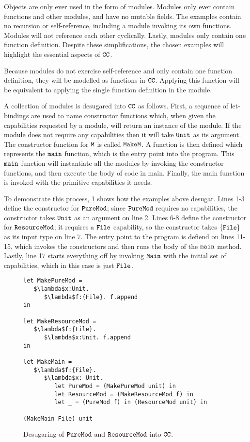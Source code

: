 Objects are only ever used in the form of modules. Modules only ever contain functions and other modules, and have no mutable fields. The examples contain no recursion or self-reference, including a module invoking its own functions. Modules will not reference each other cyclically. Lastly, modules only contain one function definition. Despite these simplifications, the chosen examples will highlight the essential aspects of $\mathtt{CC}$.

Because modules do not exercise self-reference and only contain one function definition, they will be modelled as functions in $\mathtt{CC}$. Applying this function will be equivalent to applying the single function definition in the module.

A collection of modules is desugared into $\mathtt{CC}$ as follows. First, a sequence of let-bindings are used to name constructor functions which, when given the capabilities requested by a module, will return an instance of the module. If the module does not require any capabilities then it will take $\mathtt{Unit}$ as its argument. The constructor function for $\mathtt{M}$ is called $\mathtt{MakeM}$. A function is then defined which represents the $\mathtt{main}$ function, which is the entry point into the program. This $\mathtt{main}$ function will instantiate all the modules by invoking the constructor functions, and then execute the body of code in main. Finally, the main function is invoked with the primitive capabilities it needs.

To demonstrate this process, \ref{fig:wyv_tutorial_desugaring} shows how the examples above desugar. Lines 1-3 define the constructor for $\mathtt{PureMod}$; since $\mathtt{PureMod}$ requires no capabilities, the constructor takes $\mathtt{Unit}$ as an argument on line 2. Lines 6-8 define the constructor for $\mathtt{ResourceMod}$; it requires a $\mathtt{File}$ capability, so the constructor takes $\mathtt{\{File\}}$ as its input type on line 7. The entry point to the program is defiend on lines 11-15, which invokes the constructors and then runs the body of the $\mathtt{main}$ method. Lastly, line 17 starts everything off by invoking $\mathtt{Main}$ with the initial set of capabilities, which in this case is just $\mathtt{File}$.

\begin{figure}[h]

\begin{lstlisting}
let MakePureMod =
   $\lambda$x:Unit.
      $\lambda$f:{File}. f.append
in

let MakeResourceMod =
   $\lambda$f:{File}.
      $\lambda$x:Unit. f.append
in

let MakeMain =
   $\lambda$f:{File}.
      $\lambda$x: Unit.
         let PureMod = (MakePureMod unit) in
         let ResourceMod = (MakeResourceMod f) in
         let _ = (PureMod f) in (ResourceMod unit) in

(MakeMain File) unit
\end{lstlisting}

\caption{Desugaring of $\mathtt{PureMod}$ and $\mathtt{ResourceMod}$ into $\mathtt{CC}$.}
\label{fig:wyv_tutorial_desugaring}
\end{figure}

